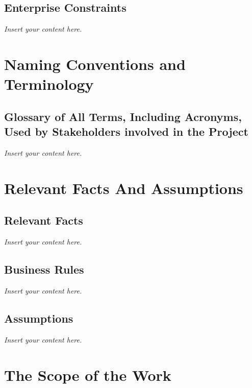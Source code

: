 \documentclass[12pt]{article}
\newcommand{\lips}{\textit{Insert your content here.}}
\begin{document}
\subsection{Enterprise Constraints}
\lips

\section{Naming Conventions and Terminology}
\subsection{Glossary of All Terms, Including Acronyms, Used by Stakeholders
involved in the Project}
\lips

\section{Relevant Facts And Assumptions}
\subsection{Relevant Facts}
\lips
\subsection{Business Rules}
\lips
\subsection{Assumptions}
\lips

\section{The Scope of the Work}
\end{document}
